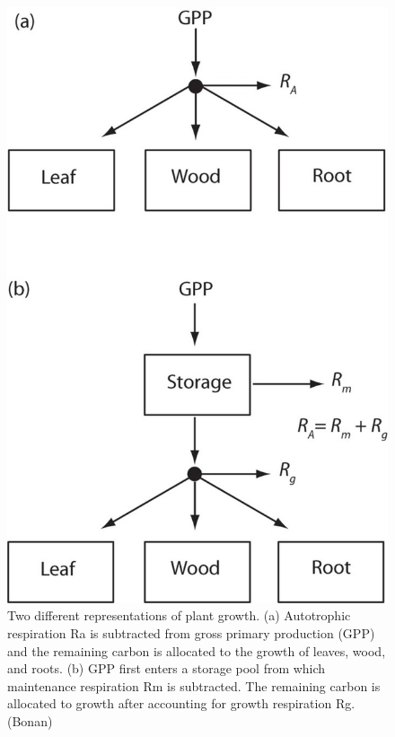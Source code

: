 \documentclass[
  12pt,
  oneside]{book}
\begin{document}
\begin{figure}

{\centering \includegraphics[width=0.8\linewidth]{figures/chap5/f59_storage_pool} 

}

\caption{Two different representations of plant growth. (a) Autotrophic respiration Ra is subtracted from gross primary production (GPP) and the remaining carbon is allocated to the growth of leaves, wood, and roots. (b) GPP first enters a storage pool from which maintenance respiration Rm is subtracted. The remaining carbon is allocated to growth after accounting for growth respiration Rg.(Bonan)}\label{fig:f59}
\end{figure}
\end{document}
